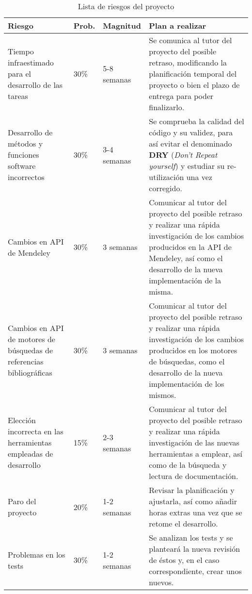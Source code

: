 \begin{table}[!hbt]
	\begin{center}
		\begin{tabular}{|p{3.5cm}|p{1.5cm}|p{2cm}|p{6cm}|}
			\hline
			\textbf{Riesgo} & \textbf{Prob.} & \textbf{Magnitud} & \textbf{Plan a realizar}\\
			\hline
			Tiempo infraestimado para el desarrollo de las tareas & 30\% & 5-8 semanas & Se comunica al tutor del proyecto del posible retraso, modificando la planificación temporal del proyecto o bien el plazo de entrega para poder finalizarlo.\\
			\hline
			Desarrollo de métodos y funciones software incorrectos & 30\% & 3-4 semanas & Se comprueba la calidad del código y su validez, para así evitar el denominado \textbf{DRY} (\textit{Don't Repeat yourself}) y estudiar su re-utilización una vez corregido.\\
			\hline
			Cambios en API de Mendeley & 30\% & 3 semanas & Comunicar al tutor del proyecto del posible retraso y realizar una rápida investigación de los cambios producidos en la API de Mendeley, así como el desarrollo de la nueva implementación de la misma.\\
			\hline
			Cambios en API de motores de búsquedas de referencias bibliográficas & 30\% & 3 semanas & Comunicar al tutor del proyecto del posible retraso y realizar una rápida investigación de los cambios producidos en los motores de búsquedas, como el desarrollo de la nueva implementación de los mismos.\\
			\hline
			Elección incorrecta en las herramientas empleadas de desarrollo & 15\% & 2-3 semanas & Comunicar al tutor del proyecto del posible retraso y realizar una rápida investigación de las nuevas herramientas a emplear, así como de la búsqueda y lectura de documentación.\\
			\hline
			Paro del proyecto & 20\% & 1-2 semanas & Revisar la planificación y ajustarla, así como añadir horas extras una vez que se retome el desarrollo.\\
			\hline
			Problemas en los tests & 30\% & 1-2 semanas & Se analizan los tests y se planteará la nueva revisión de éstos y, en el caso correspondiente, crear unos nuevos.\\
			\hline
		\end{tabular}
		\caption{Lista de riesgos del proyecto}
		\label{table:riesgos}
	\end{center}
\end{table}

